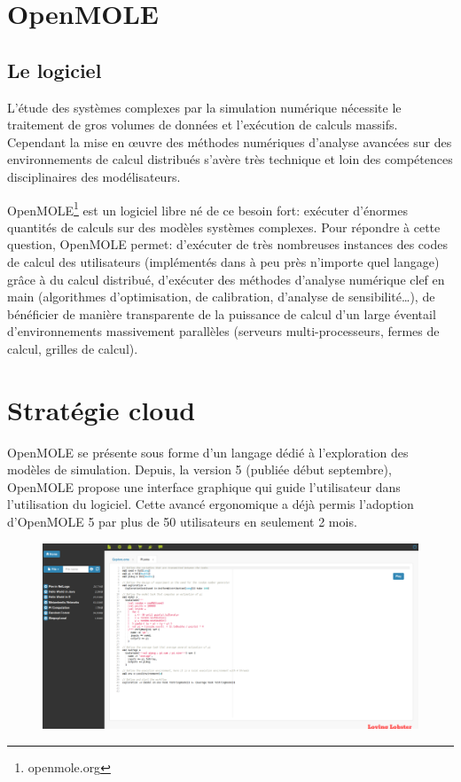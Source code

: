 \documentclass[10pt,a4paper]{article}
\begin{document}
\section{OpenMOLE}

\subsection{Le logiciel}

L'étude des systèmes complexes par la simulation numérique nécessite le traitement de gros volumes de données et l’exécution de calculs massifs. Cependant la mise en œuvre des méthodes numériques d'analyse avancées sur des environnements de calcul distribués s’avère très technique et loin des compétences disciplinaires des modélisateurs.

OpenMOLE\footnote{openmole.org} est un logiciel libre né de ce besoin fort: exécuter d'énormes quantités de calculs sur des modèles systèmes complexes. Pour répondre à cette question, OpenMOLE permet: d’exécuter de très nombreuses instances des codes de calcul des utilisateurs (implémentés dans à peu près n'importe quel langage) grâce à du calcul distribué, d’exécuter des méthodes d'analyse numérique clef en main (algorithmes d'optimisation, de calibration, d'analyse de sensibilité…), de bénéficier de manière transparente de la puissance de calcul d'un large éventail d'environnements massivement parallèles  (serveurs multi-processeurs, fermes de calcul, grilles de calcul).


\section{Stratégie cloud}

OpenMOLE se présente sous forme d'un langage dédié à l'exploration des modèles de simulation. Depuis, la version 5 (publiée début septembre), OpenMOLE propose une interface graphique qui guide l'utilisateur dans l'utilisation du logiciel. Cette avancé ergonomique a déjà permis l'adoption d'OpenMOLE 5 par plus de 50 utilisateurs en seulement 2 mois. 

\begin{figure}[h]
 \centering
  \includegraphics[width=0.8\linewidth]{img/openmoleUI.png}
\end{figure}
\end{document}
